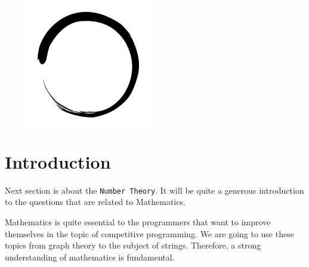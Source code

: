 \documentclass[12pt]{article}
\title{\vspace{-2em}\mytitle\vspace{-0.3em}}
\author{\textbf{Editor}\\Sadık Ekin Özbay \\ \ \\ \textbf{Reviewers} \\Yusuf Hakan Kalaycı \\ Burak Buğrul \\ Kadır Emre Oto }
\date{}
\begin{document}
\begin{figure}
  \centering
  \includegraphics[width=\linewidth/4]{inzva-logo.png}
  \label{fig:inzva}
\end{figure}
\maketitle

\cleardoublepage
\tableofcontents
{}
\cleardoublepage

\section{Introduction}

Next section is about the \texttt{Number Theory}. It will be quite a generous introduction to the questions that are related to Mathematics.  

Mathematics is quite essential to the programmers that want to improve themselves in the topic of competitive programming. We are going to use these topics from graph theory to the subject of strings.  Therefore, a strong understanding of mathematics is fundamental.
\end{document}
